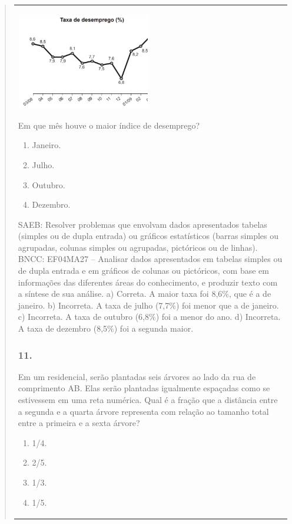 \begin{mdframed}[linewidth=2pt,linecolor=salmao,roundcorner=2pt]
\begin{itemize}
{\begin{itemize}
\begin{escolha}
{\begin{quote}
{\begin{escolha}
{{{{{\begin{longtable}[]{@{}l@{}}
\begin{itemize}
{\includegraphics[width=2.29697in,height=1.66026in]{media/image146.png}

Em que mês houve o maior índice de desemprego?

\begin{enumerate}
\item
  Janeiro.
\item
  Julho.
\item
  Outubro.
\item
  Dezembro.
\end{enumerate}

SAEB: Resolver problemas que envolvam dados apresentados
tabelas (simples ou de dupla entrada) ou gráficos estatísticos (barras
simples ou agrupadas, colunas simples ou agrupadas, pictóricos ou de
linhas).
BNCC: EF04MA27 -- Analisar dados apresentados em tabelas simples ou de dupla entrada e em gráficos de
colunas ou pictóricos, com base em informações das diferentes áreas do conhecimento, e produzir
texto com a síntese de sua análise.
a) Correta. A maior taxa foi 8,6\%, que é a de janeiro.
b) Incorreta. A taxa de julho (7,7\%) foi menor que a de janeiro.
c) Incorreta. A taxa de outubro (6,8\%) foi a menor do ano.
d) Incorreta. A taxa de dezembro (8,5\%) foi a segunda maior.

\subsubsection{11.}

Em um residencial, serão plantadas seis árvores ao lado da rua de comprimento AB. Elas
serão plantadas igualmente espaçadas como se estivessem em uma reta numérica.
Qual é a fração que a distância entre a segunda e a quarta árvore
representa com relação ao tamanho total entre a primeira e a sexta árvore?

\begin{enumerate}
\item
  1/4.
\item
  2/5.
\item
  1/3.
\item
  1/5.
\end{enumerate}

}
\end{itemize}
\end{longtable}}}}}}
\end{escolha}}
\end{quote}}
\end{escolha}
\end{itemize}}
\end{itemize}
\end{mdframed}
